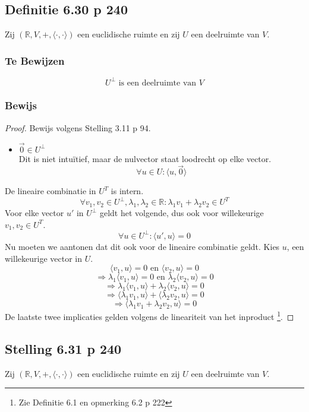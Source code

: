 \documentclass[lineaire_algebra_oplossingen.tex]{subfiles}
\begin{document}
\subsection{Definitie 6.30 p 240}
\label{6.30}
Zij $(\mathbb{R}, V,+, \langle \cdot,\cdot \rangle)$ een euclidische ruimte en zij $U$ een deelruimte van $V$.

\subsubsection*{Te Bewijzen}
\[
U^\bot \text{ is een deelruimte van } V
\]

\subsubsection*{Bewijs}
\begin{proof}
Bewijs volgens Stelling 3.11 p 94.
\begin{itemize}
\item $\vec{0} \in U^\bot$\\
Dit is niet intu\"itief, maar de nulvector staat loodrecht op elke vector.
\[
\forall u \in U: \langle u, \vec{0} \rangle
\]
\end{itemize}

\item De lineaire combinatie in $U^T$ is intern.
\[
\forall v_1,v_2\in U^\bot, \lambda_1,\lambda_2 \in \mathbb{R} : \lambda_1v_1 + \lambda_2v_2 \in U^T
\]
Voor elke vector $u'$ in $U^\bot$ geldt het volgende, dus ook voor willekeurige $v_1,v_2\in U^T$.
\[
\forall u\in U^\bot: \langle u',u\rangle = 0
\]
Nu moeten we aantonen dat dit ook voor de lineaire combinatie geldt. Kies $u$, een willekeurige vector in $U$.
\[
\langle v_1,u\rangle = 0 \text{ en } \langle v_2,u\rangle = 0
\]
\[
\Rightarrow
\lambda_1\langle v_1,u\rangle = 0 \text{ en } \lambda_2\langle v_2,u\rangle = 0
\]
\[
\Rightarrow
\lambda_1\langle v_1,u\rangle + \lambda_2\langle v_2,u\rangle = 0
\]
\[
\Rightarrow
\langle \lambda_1v_1,u\rangle + \langle \lambda_2v_2,u\rangle = 0
\]
\[
\Rightarrow
\langle \lambda_1v_1 + \lambda_2v_2,u\rangle = 0
\]
De laatste twee implicaties gelden volgens de lineariteit van het inproduct \footnote{Zie Definitie 6.1 en opmerking 6.2 p 222}.
\end{proof}


\subsection{Stelling 6.31 p 240}
\label{6.31}
Zij $(\mathbb{R}, V,+, \langle \cdot,\cdot \rangle)$ een euclidische ruimte en zij $U$ een deelruimte van $V$.
\end{document}
